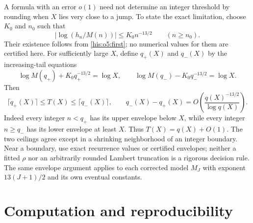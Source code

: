 \documentclass[11pt]{article}
\theoremstyle{remark}\newtheorem{remark}[theorem]{Remark}
\numberwithin{equation}{section}
\begin{document}
A formula with an error $o(1)$ need not determine an integer threshold by
rounding when $X$ lies very close to a jump. To state the exact limitation,
choose $K_0$ and $n_0$ such that
\[
|\log(h_n/M(n))|\le K_0 n^{-13/2}\qquad(n\ge n_0).
\]
Their existence follows from \eqref{his:o5:first}; no numerical values for them
are certified here. For sufficiently large $X$, define $q_+(X)$ and
$q_-(X)$ by the increasing-tail equations
\[
\log M(q_+)+K_0q_+^{-13/2}=\log X,\qquad
\log M(q_-)-K_0q_-^{-13/2}=\log X.
\]
Then
\begin{equation}\label{his:o5:rounding}
\lceil q_+(X)\rceil\le T(X)\le\lceil q_-(X)\rceil,
\qquad
q_-(X)-q_+(X)=O\!\left(\frac{q(X)^{-13/2}}{\log q(X)}\right).
\end{equation}
Indeed every integer $n<q_+$ has its upper envelope below $X$, while
every integer $n\ge q_-$ has its lower envelope at least $X$.
Thus $T(X)=q(X)+O(1)$. The two ceilings agree except in a shrinking
neighborhood of an integer boundary. Near a boundary, use exact
recurrence values or certified envelopes; neither a fitted $\rho$ nor
an arbitrarily rounded Lambert truncation is a rigorous decision rule.
The same envelope argument applies to each corrected model $M_J$ with
exponent $13(J+1)/2$ and its own eventual constants.

\section{Computation and reproducibility}\label{his:o5:computations}
\end{document}
